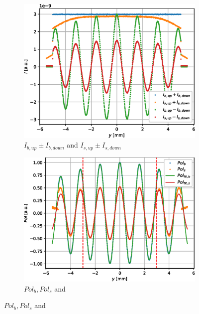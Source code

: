 \documentclass{article}
\begin{document}
\begin{figure}[htbp]
	\centering
	\begin{subfigure}[b]{0.45\textwidth}
		\centering
		\includegraphics[width=\textwidth]{simulation-raw-intensity-differential}
		\caption{$I_{b,up} \pm I_{b,down}$ and $I_{s,up} \pm I_{s,down}$}
		\label{fig:simulation-raw-intensity-differential}
	\end{subfigure}
	\hfill
	\begin{subfigure}[b]{0.45\textwidth}
		\centering
		\includegraphics[width=\textwidth]{simulation-raw-intensity-pol}
		\caption{$Pol_b, Pol_s$ and}
		\label{fig:simulation-raw-intensity-pol}
	\end{subfigure}

\end{figure}
\end{document}
